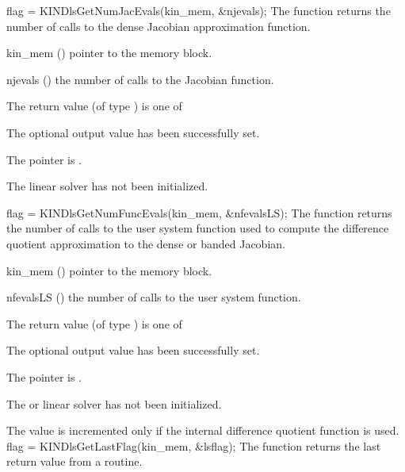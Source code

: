 {
  flag = KINDlsGetNumJacEvals(kin\_mem, \&njevals);
}
{
  The function  returns the
  number of calls to the dense Jacobian approximation function.
}
{
  \begin{args}
  \item[kin\_mem] ()
    pointer to the {\kinsol} memory block.
  \item[njevals] ()
    the number of calls to the Jacobian function.
  \end{args}
}
{
  The return value  (of type ) is one of
  \begin{args}
  \item[\Id{KINDLS\_SUCCESS}] 
    The optional output value has been successfully set.
  \item[\Id{KINDLS\_MEM\_NULL}]
    The  pointer is .
  \item[\Id{KINDLS\_LMEM\_NULL}]
    The {\kindense} linear solver has not been initialized.
  \end{args}
}
{}
{
  flag = KINDlsGetNumFuncEvals(kin\_mem, \&nfevalsLS);
}
{
  The function  returns the number of calls
  to the user system function used to compute the difference quotient
  approximation to the dense or banded Jacobian.
}
{
  \begin{args}
  \item[kin\_mem] ()
    pointer to the {\kinsol} memory block.
  \item[nfevalsLS] ()
    the number of calls to the user system function.
  \end{args}
}
{
  The return value  (of type ) is one of
  \begin{args}
  \item[\Id{KINDLS\_SUCCESS}] 
    The optional output value has been successfully set.
  \item[\Id{KINDLS\_MEM\_NULL}]
    The  pointer is .
  \item[\Id{KINDLS\_LMEM\_NULL}]
    The {\kindense} or {\kinband} linear solver has not been initialized.
  \end{args}
}
{
  The value  is incremented only if the internal
  difference quotient function is used.
}
{
  flag = KINDlsGetLastFlag(kin\_mem, \&lsflag);
}
{
  The function  returns the
  last return value from a {\kindense} routine. 
}
